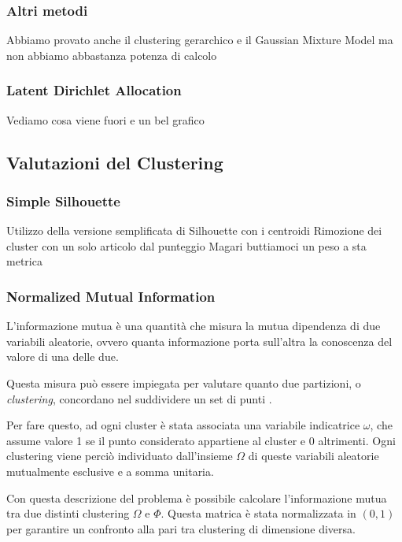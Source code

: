 \documentclass[
	12pt, %
	a4paper, %
	oneside, %
	headinclude,footinclude, %
	BCOR5mm, %
]{scrartcl}
\begin{document}
		\subsubsection{Altri metodi}

			Abbiamo provato anche il clustering gerarchico e il Gaussian Mixture Model
			ma non abbiamo abbastanza potenza di calcolo

		\subsubsection{Latent Dirichlet Allocation}

			Vediamo cosa viene fuori e un bel grafico


	\subsection{Valutazioni del Clustering}

		\subsubsection{Simple Silhouette}
			Utilizzo della versione semplificata di Silhouette con i centroidi
			Rimozione dei cluster con un solo articolo dal punteggio
			Magari buttiamoci un peso a sta metrica

		\subsubsection{Normalized Mutual Information}
			L'informazione mutua è una quantità che misura la mutua dipendenza di due variabili aleatorie, ovvero quanta informazione porta sull'altra la conoscenza del valore di una delle due.

			Questa misura può essere impiegata per valutare quanto due partizioni, o \emph{clustering}, concordano nel suddividere un set di punti \cite{Manning}.

			Per fare questo, ad ogni cluster è stata associata una variabile indicatrice $\omega$, che assume valore 1 se il punto considerato appartiene al cluster e 0 altrimenti.
			Ogni clustering viene perciò individuato dall'insieme $\Omega$ di queste variabili aleatorie mutualmente esclusive e a somma unitaria.

			Con questa descrizione del problema è possibile calcolare l'informazione mutua tra due distinti clustering $\Omega$ e $\Phi$.
			Questa matrica è stata normalizzata in $(0, 1)$ per garantire un confronto alla pari tra clustering di dimensione diversa.
\end{document}
